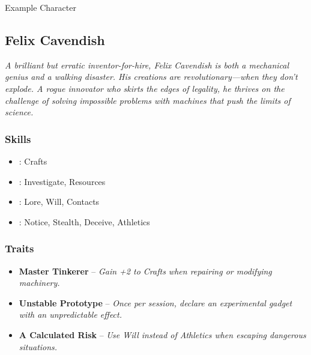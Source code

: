 \begin{DndSidebar}[float=!t]{Example Character}
	\subsection{Felix Cavendish}
	\emph{A brilliant but erratic inventor-for-hire, Felix Cavendish is both a mechanical genius and a walking disaster. His creations are revolutionary—when they don’t explode. A rogue innovator who skirts the edges of legality, he thrives on the challenge of solving impossible problems with machines that push the limits of science.}

	\subsubsection*{Skills}
	\begin{itemize}
    	\item \Expert: Crafts
	    \item \Skilled: Investigate, Resources
    	\item \Novice: Lore, Will, Contacts
	    \item \Untrained: Notice, Stealth, Deceive, Athletics
	\end{itemize}

	\subsubsection*{Traits}
	\begin{itemize}
    	\item \textbf{Master Tinkerer} – \emph{Gain +2 to Crafts when repairing or modifying machinery.}
	    \item \textbf{Unstable Prototype} – \emph{Once per session, declare an experimental gadget with an unpredictable effect.}
    	\item \textbf{A Calculated Risk} – \emph{Use Will instead of Athletics when escaping dangerous situations.}
	\end{itemize}
\end{DndSidebar}
